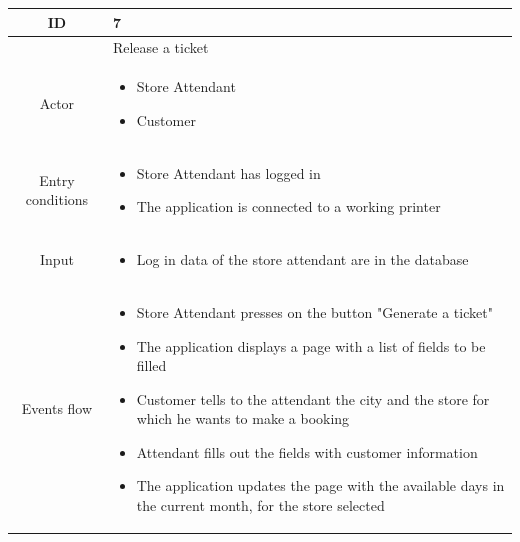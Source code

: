 \documentclass[table, 12pt]{article}
\begin{document}
\begin{longtable}{|c| p{10cm}|}
    \hline
    ID               & 7                                                                                                                                                            \\
    \hline
                     & Release a ticket                                                                                                                                             \\
    \hline
    Actor            & \begin{itemize}
        \item Store Attendant
        \item Customer
    \end{itemize}                                                                                                                                   \\
    \hline
    Entry conditions & \begin{itemize}
        \item Store Attendant has logged in
        \item The application is connected to a working printer
    \end{itemize}                                                                                                                                   \\ \hline
    Input            & \begin{itemize}
        \item Log in data of the store attendant are in the database
    \end{itemize}                                                                                                                                   \\
    \hline
    Events flow      & \begin{itemize}[nosep,after=\strut]
        \item Store Attendant presses on the button "Generate a ticket"
        \item The application displays a page with a list of fields to be filled
        \item Customer tells to the attendant the city and the store for which he wants to make a booking
        \item Attendant fills out the fields with customer information
        \item The application updates the page with the available days in the current month, for the store selected

\end{itemize}
\end{longtable}
\end{document}
